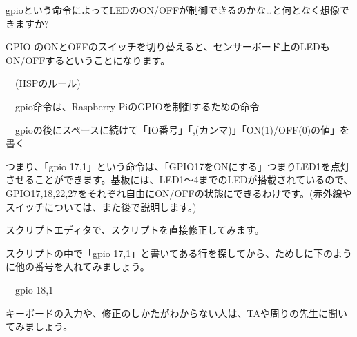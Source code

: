 \documentclass[a4paper,dvipdfmx]{jarticle}
\begin{document}
\bigskip


\bigskip


\bigskip


\bigskip


\bigskip


\bigskip


\bigskip


\bigskip


\bigskip


\bigskip


\bigskip


\bigskip


\bigskip


\bigskip


\bigskip


\bigskip


\bigskip


\bigskip


\bigskip

gpioという命令によってLEDのON/OFFが制御できるのかな…と何となく想像できますか?

GPIO
のONとOFFのスイッチを切り替えると、センサーボード上のLEDもON/OFFするということになります。


\bigskip

\ \ (HSPのルール)


\bigskip

\ \ gpio命令は、Raspberry
PiのGPIOを制御するための命令

\ \ gpioの後にスペースに続けて「IO番号」「,(カンマ)」「ON(1)/OFF(0)の値」を書く


\bigskip


\bigskip

つまり、「gpio
17,1」という命令は、「GPIO17をONにする」つまりLED1を点灯させることができます。基板には、LED1〜4までのLEDが搭載されているので、GPIO17,18,22,27をそれぞれ自由にON/OFFの状態にできるわけです。(赤外線やスイッチについては、また後で説明します。)


\bigskip

スクリプトエディタで、スクリプトを直接修正してみます。

スクリプトの中で「gpio
17,1」と書いてある行を探してから、ためしに下のように他の番号を入れてみましょう。


\bigskip

\ \ gpio 18,1


\bigskip


\bigskip

キーボードの入力や、修正のしかたがわからない人は、TAや周りの先生に聞いてみましょう。
\end{document}
